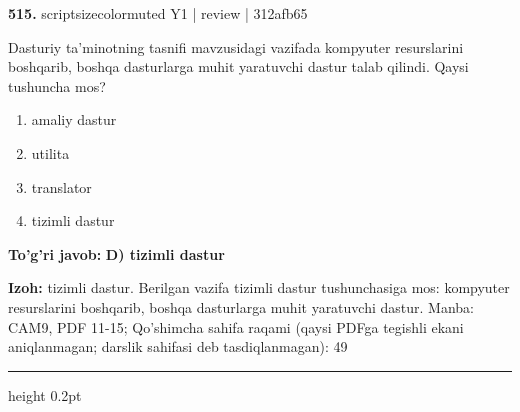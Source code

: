 \documentclass[10pt,a4paper]{article}
\begin{document}
{\bfseries\sffamily\color{ink} 515.} {scriptsizecolor{muted} Y1 | review | 312afb65}
\par
Dasturiy ta'minotning tasnifi mavzusidagi vazifada kompyuter resurslarini boshqarib, boshqa dasturlarga muhit yaratuvchi dastur talab qilindi. Qaysi tushuncha mos?
\begin{enumerate}[label=\Alph*),leftmargin=9mm]
\item amaliy dastur
\item utilita
\item translator
\item tizimli dastur
\end{enumerate}
\begin{tcolorbox}[enhanced,breakable,colback=teal!4,colframe=teal!60!black,boxrule=0.45pt,arc=1.2mm,left=2.7mm,right=2.7mm,top=1.8mm,bottom=1.8mm,before skip=2mm,after skip=2mm]
{\bfseries\sffamily\color{teal}To'g'ri javob:} \textbf{D) tizimli dastur}
\par\smallskip
{\bfseries Izoh:} tizimli dastur. Berilgan vazifa tizimli dastur tushunchasiga mos: kompyuter resurslarini boshqarib, boshqa dasturlarga muhit yaratuvchi dastur. Manba: CAM9, PDF 11-15; Qo'shimcha sahifa raqami (qaysi PDFga tegishli ekani aniqlanmagan; darslik sahifasi deb tasdiqlanmagan): 49
\end{tcolorbox}
\vspace{2mm}\hrule height 0.2pt\vspace{3mm}
\end{document}
